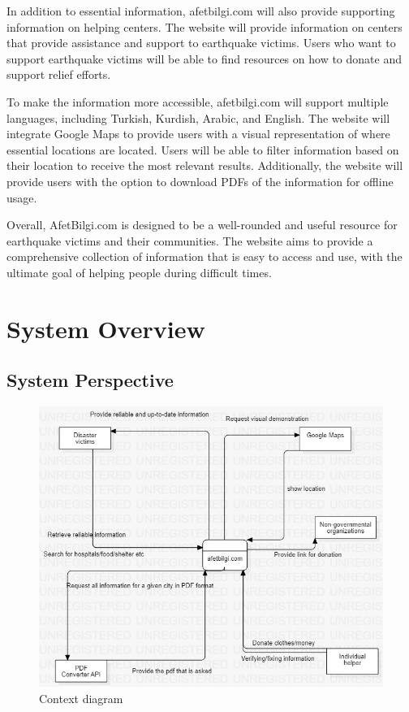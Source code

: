 \documentclass[12pt]{report}
\begin{document}
In addition to essential information, afetbilgi.com will also provide supporting information on 
helping centers. The website will provide information on centers that provide assistance and support 
to earthquake victims. Users who want to support earthquake victims will be able to find resources on
how to donate and support relief efforts.
\newline

To make the information more accessible, afetbilgi.com will support multiple languages, including 
Turkish, Kurdish, Arabic, and English. The website will integrate Google Maps to provide users with 
a visual representation of where essential locations are located. Users will be able to filter 
information based on their location to receive the most relevant results. Additionally, the website 
will provide users with the option to download PDFs of the information for offline usage.
\newline

Overall, AfetBilgi.com is designed to be a well-rounded and useful resource for earthquake victims 
and their communities. The website aims to provide a comprehensive collection of information that is 
easy to access and use, with the ultimate goal of helping people during difficult times.

\section{System Overview}

\subsection{System Perspective}

\begin{figure}[H]
    \includegraphics[scale=0.5]{context-diagram}
    \centering
    \caption{Context diagram}
\end{figure}
\end{document}
